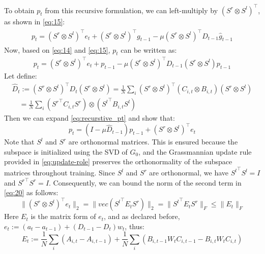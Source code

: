 To obtain \(p_t\) from this recursive formulation, we can left-multiply by \({(S^r \otimes S^l)}^\top\), as shown in \eqref{eq:15}:
\begin{eqnarray}
\begin{split}
    p_t = {(S^r \otimes S^l)}^\top e_t + {(S^r \otimes S^l)}^\top g_{t-1} - 
    \mu {(S^r \otimes S^l)}^\top D_{t-1} \widehat{g}_{t-1}
\end{split}
\end{eqnarray}
Now, based on \eqref{eq:14} and \eqref{eq:15}, \(p_t\) can be written as:
\begin{eqnarray}
    p_t = {(S^r \otimes S^l)}^\top e_t + p_{t-1} - \mu {(S^r \otimes S^l)}^\top D_{t-1} {(S^r \otimes S^l)}p_{t-1} \label{eq:recurstive_pt}
\end{eqnarray}
Let define:
\begin{equation}
\begin{gathered}
 \widehat{D}_t := {(S^r \otimes S^l)}^\top D_t (S^r \otimes S^l) = \frac1N \sum_i {(S^r \otimes S^l)}^\top (C_{i,t} \otimes B_{i,t}) (S^r \otimes S^l) \\ \quad
 =\frac1N \sum_i ({S^r}^\top C_{i,t}S^r) \otimes ({S^l}^\top B_{i,t} S^l) 
 \end{gathered}
\end{equation}
Then we can expand \eqref{eq:recurstive_pt} and show that:
\begin{equation}
    p_t = (I - \mu \hat D_{t-1})p_{t-1} + (S^r \otimes S^l)^\top e_t
    \label{eq:20}
\end{equation}
Note that \(S^l\) and \(S^r\) are orthonormal matrices. This is ensured because the subspace is initialized using the SVD of \(G_0\), and the Grassmannian update rule provided in \eqref{eq:update-role} preserves the orthonormality of the subspace matrices throughout training. Since \(S^l\) and \(S^r\) are orthonormal, we have \({S^l}^\top S^l = I\) and \({S^r}^\top S^r = I\). Consequently, we can bound the norm of the second term in \eqref{eq:20} as follows:
\begin{equation}
\|(S^r \otimes S^l)^\top e_t\|_2 = \|vec({S^l}^\top E_t S^r)\|_2 = \|{S^l}^\top E_t S^r\|_F \le \|E_t\|_F
\end{equation}
Here \(E_t\) is the matrix form of \(e_t\), and as declared before, \(e_t := (a_t - a_{t-1}) + (D_{t-1} - D_t) w_t\), thus:
\begin{equation}
E_t := \frac1N\sum_i (A_{i,t} - A_{i,t-1}) + \frac1N\sum_i (B_{i,t-1} W_t C_{i,t-1} - B_{i,t} W_t C_{i,t}) \label{eq:22}
\end{equation}
